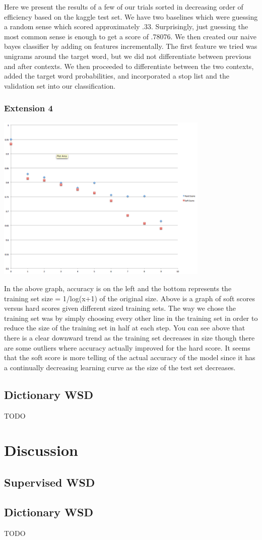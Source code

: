 \documentclass[11pt]{article}
\begin{document}
Here we present the results of a few of our trials sorted in decreasing order of efficiency based on the kaggle test set. We have two baselines which were guessing a random sense which scored approximately .33. Surprisingly, just guessing the most common sense is enough to get a score of .78076. We then created our naive bayes classifier by adding on features incrementally. The first feature we tried was unigrams around the target word, but we did not differentiate between previous and after contexts. We then proceeded to differentiate between the two contexts, added the target word probabilities, and incorporated a stop list and the validation set into our classification.

\subsubsection{Extension 4}
\includegraphics[width = 4in]{data_plot.png}

In the above graph, accuracy is on the left and the bottom represents the training set size = 1/log(x+1) of the original size.
Above is a graph of soft scores versus hard scores given different sized training sets. The way we chose the training set was by simply choosing every other line in the training set in order to reduce the size of the training set in half at each step. You can see above that there is a clear downward trend as the training set decreases in size though there are some outliers where accuracy actually improved for the hard score. It seems that the soft score is more telling of the actual accuracy of the model since it has a continually decreasing learning curve as the size of the test set decreases.

\subsection{Dictionary WSD}
TODO

\section{Discussion}
\subsection{Supervised WSD}


\subsection{Dictionary WSD}
TODO
\end{document}
